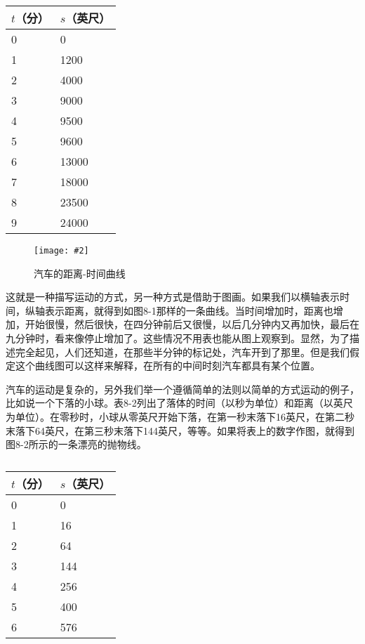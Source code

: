 \documentclass[12pt,oneside]{book}
\newenvironment{fig}[2][1]
{\begin{figure}[H]
\centering
\texttt{[image: \#2]}}
{\end{figure}}
\begin{document}
\label{tab:表8.1}
\begin{table}[H]
\centering
\medskip 
\begin{tabular}{@{}ll@{}}
\toprule
$t$（分） & $s$（英尺）  \\ \midrule
0 & 0     \\
1 & 1200  \\
2 & 4000  \\
3 & 9000  \\
4 & 9500  \\
5 & 9600  \\
6 & 13000 \\
7 & 18000 \\
8 & 23500 \\
9 & 24000 
\\ \bottomrule
\end{tabular}
\caption{}
\end{table}


\begin{fig}{汽车的距离-时间曲线}
\caption{汽车的距离-时间曲线}
\label{fig:汽车的距离-时间曲线}
\end{fig}


这就是一种描写运动的方式，另一种方式是借助于图画。如果我们以横轴表示时间，纵轴表示距离，就得到如图8-1那样的一条曲线。当时间增加时，距离也增加，开始很慢，然后很快，在四分钟前后又很慢，以后几分钟内又再加快，最后在九分钟时，看来像停止增加了。这些情况不用表也能从图上观察到。显然，为了描述完全起见，人们还知道，在那些半分钟的标记处，汽车开到了那里。但是我们假定这个曲线图可以这样来解释，在所有的中间时刻汽车都具有某个位置。


汽车的运动是复杂的，另外我们举一个遵循简单的法则以简单的方式运动的例子，比如说一个下落的小球。表8-2列出了落体的时间（以秒为单位）和距离（以英尺为单位）。在零秒时，小球从零英尺开始下落，在第一秒末落下16英尺，在第二秒末落下64英尺，在第三秒末落下144英尺，等等。如果将表上的数字作图，就得到图8-2所示的一条漂亮的抛物线。

\label{tab:表8.2}
\begin{table}[H]
\centering
\medskip 
\begin{tabular}{@{}ll@{}}
\toprule
$t$（分） & $s$（英尺）  \\ \midrule
0 & 0     \\
1 & 16  \\
2 & 64  \\
3 & 144  \\
4 & 256  \\
5 & 400  \\
6 & 576 
\\ \bottomrule
\end{tabular}
\caption{}
\end{table}
\end{document}
